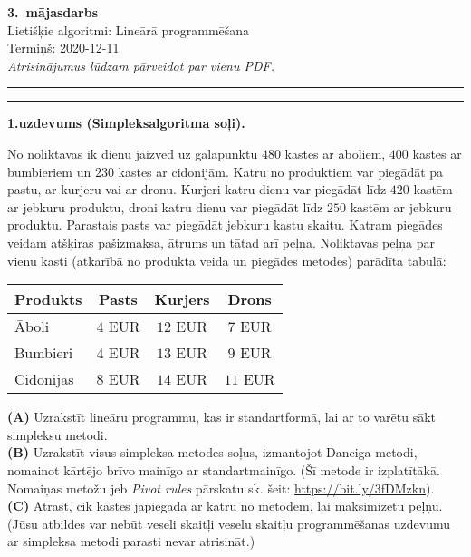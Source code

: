 \documentclass[a4paper,12pt]{article}
\begin{document}
\begin{center}
{\bf\Huge 3.\ mājasdarbs} \\[5pt]
Lietišķie algoritmi: Lineārā programmēšana \\
Termiņš: 2020-12-11\\[5pt]
{\em Atrisinājumus lūdzam pārveidot par vienu PDF.}
\end{center}

\hrule
\vspace{2pt}
\hrule
\vspace{12pt}



\vspace{10pt}
{\bf 1.uzdevums (Simpleksalgoritma soļi).}

No noliktavas ik dienu jāizved uz galapunktu $480$ kastes
ar āboliem, $400$ kastes ar bumbieriem un $230$ kastes ar cidonijām. 
Katru no produktiem var piegādāt pa pastu, ar kurjeru vai ar dronu. 
Kurjeri katru dienu var piegādāt līdz $420$ kastēm ar jebkuru produktu, 
droni katru dienu var pie\-gā\-dāt līdz $250$ kastēm ar jebkuru produktu. 
Parastais pasts var piegādāt jebkuru kastu skaitu. 
Katram piegādes veidam atšķiras pašizmaksa, āt\-rums un tātad \textendash{} arī 
peļņa. Noliktavas peļņa par vienu kasti (atkarībā no produkta veida 
un pie\-gā\-des metodes) 
parādīta tabulā: 

\vspace{4pt}
\begin{tabular}{|l|c|c|c|} \hline
Produkts & Pasts & Kurjers & Drons \\ \hline
Āboli & $4$ EUR & $12$ EUR & $7$ EUR \\ \hline
Bumbieri & $4$ EUR & $13$ EUR & $9$ EUR \\ \hline
Cidonijas & $8$ EUR & $14$ EUR & $11$ EUR \\ \hline
\end{tabular}

\vspace{4pt}
{\bf (A)} Uzrakstīt lineāru programmu, kas ir standartformā, lai ar to varētu sākt simpleksu metodi.\\
{\bf (B)} Uzrakstīt visus simpleksa metodes soļus, izmantojot Danciga metodi, nomainot kārtējo brī\-vo mainīgo 
ar standartmainīgo. (Šī metode ir izplatītākā. Nomaiņas metožu jeb {\em Pivot rules} pār\-ska\-tu sk. 
šeit: \url{https://bit.ly/3fDMzkn}).\\
{\bf (C)} Atrast, cik kastes jāpiegādā ar katru no me\-to\-dēm, lai maksimizētu peļņu. 
(Jūsu atbildes var nebūt veseli skaitļi \textendash{} veselu skaitļu programmēšanas uzdevumu 
ar simpleksa metodi parasti nevar atrisināt.) 
\end{document}
